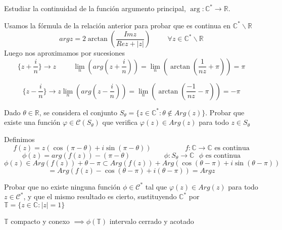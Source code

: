 \begin{ejer}
	Estudiar la continuidad de la función argumento principal, $\arg : \mathbb{C}^{\ast} \rightarrow \mathbb{R}$.
\end{ejer}

\begin{sol}


Usamos la fórmula de la relación anterior para probar que es continua en $\mathbb{C}^{\ast} \backslash \mathbb{R}$
$$  
arg z = 2\arctan (\frac{Imz}{Rez + |z|}) \hspace{1cm} \forall z\in\mathbb{C}^{\ast}\backslash\mathbb{R}
$$
Luego nos aproximamos por sucesiones
$$  
\{ z+\frac{i}{n} \} \rightarrow z \hspace{1cm}
\lim_n(arg(z+\frac{i}{n})) = \lim_n( \arctan(\frac{1}{nz}+\pi) ) = \pi
$$

$$
\{ z-\frac{i}{n} \} \rightarrow z
\lim_n(arg(z-\frac{i}{n})) = \lim_n( \arctan(\frac{-1}{nz}-\pi) ) = -\pi
$$
\end{sol}

\begin{ejer}
	Dado $\theta\in\mathbb{R}$, se considera el conjunto $S_{\theta} = \{ z\in\mathbb{C}^{\ast} : \theta\not\in Arg(z) \}$. 
	Probar que existe una función $\varphi\in\mathcal{C}(S_{\theta})$ que verifica $\varphi(z)\in Arg(z)$ para todo $z\in S_{\theta}$
\end{ejer}

\begin{sol}
Definimos
$$
f(z) = z( \cos(\pi-\theta) + i\sin(\pi-\theta) ) \hspace{2cm} f:\mathbb{C}\rightarrow \mathbb{C} \text{ es continua}
$$
$$
\phi(z) = arg(f(z)) - (\pi-\theta) \hspace{2cm} \phi: S_{\theta} \rightarrow \mathbb{C} \text{ $\phi$ es continua}
$$
$$ 
\phi(z) \in Arg (f(z)) + \theta-\pi \subset Arg (f(z)) + Arg( \cos(\theta-\pi)+i\sin(\theta-\pi) ) 
$$
$$= Arg ( f(z)-\cos(\theta-\pi)+i(\theta-\pi) ) = Argz
$$
\end{sol}

\begin{ejer}
	Probar que no existe ninguna función $\phi\in\mathcal{C}^{\ast}$ tal que $\varphi(z)\in Arg(z)$ para todo $z\in\mathcal{C}^{\ast}$, y que el mismo resultado es cierto, sustituyendo $\mathbb{C}^{\ast}$ por $\mathbb{T}=\{ z\in\mathbb{C} : |z|=1 \}$
\end{ejer}

$\mathbb{T}$ compacto y conexo $\implies \phi(\mathbb{T})$ intervalo cerrado y acotado


